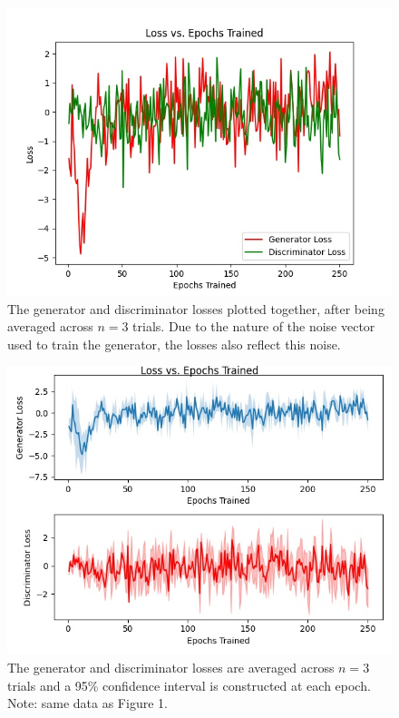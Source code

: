 \documentclass[11pt]{article}
\begin{document}
\begin{figure}[H]
    \caption{The generator and discriminator losses plotted together, after being averaged across $n=3$ trials. Due to the nature of the noise vector used to train the generator, the losses also reflect this noise.}
    \includegraphics{graph1}
    \centering
\end{figure}

\newpage

\begin{figure}[H]
    \caption{The generator and discriminator losses are averaged across $n=3$ trials and a 95\% confidence interval is constructed at each epoch.
            Note: same data as Figure 1.}
    \includegraphics{graph2}
    \centering
\end{figure}
\end{document}
